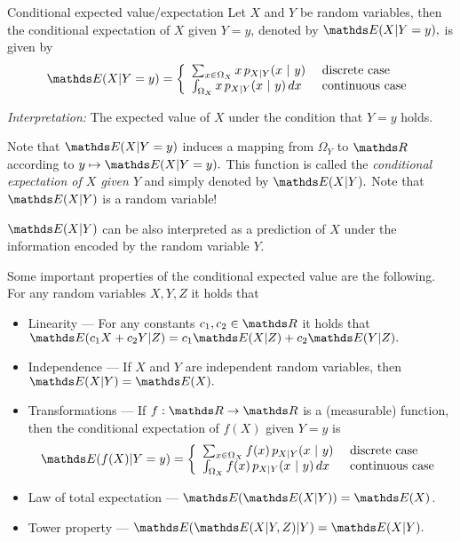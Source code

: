 \begin{vbframe}{Conditional expected value/expectation} 
%	
	Let $X$ and $Y$ be random variables, then the conditional expectation of $X$ given $Y=y$, denoted by $\E(X|Y=y),$ is given by
	$$	\E(X|Y=y) = \left\{ \begin{array}{ll}
		\sum_{x \in \Omega_X} x \, p_{X|Y}(x ~|~ y) & \text{ discrete case} \\
		\int_{\Omega_X} x \, p_{X|Y}(x ~|~ y) \, dx& \text{ continuous case} 
	\end{array} \right.  	$$
	
	\emph{Interpretation:} The expected value of $X$ under the condition that $Y=y$ holds.
	\lz
	
	Note that $\E(X|Y=y)$ induces a mapping from $\Omega_Y$ to $\R$ according to $y \mapsto \E(X|Y=y).$
	This function is called the \emph{conditional expectation of $X$ given $Y$} and simply denoted by $\E(X|Y).$
	Note that $\E(X|Y)$ is a random variable!
	
	\lz
	
	$\E(X|Y)$ can be also interpreted as a prediction of $X$ under the information encoded by the random variable $Y.$
	
	\framebreak
	
	
	Some important properties of the conditional expected value are the following. For any random variables $X,Y,Z$ it holds that
	\begin{itemize}
		\item Linearity ---  For any constants $c_1,c_2 \in \R$  it holds that $ \E(c_1 X + c_2 Y | Z) = c_1 \E(X|Z) + c_2 \E(Y|Z).$
		\item Independence --- If $X$ and $Y$ are independent random variables, then $\E(X|Y)=\E(X).$
		\item Transformations --- If $f:\R \to \R$  is a (measurable) function, then the conditional expectation of $f(X)$ given $Y=y$ is 
		$$\E(f(X)|Y=y)  = \left\{ \begin{array}{ll}
			\sum_{x \in \Omega_X} f(x) \, p_{X|Y}(x ~|~ y) & \text{ discrete case} \\
			\int_{\Omega_X} f(x) \, p_{X|Y}(x ~|~ y) \, dx & \text{ continuous case} 
		\end{array} \right.  	$$
		\item Law of total expectation ---
		$\E(\E(X|Y)) = \E(X)$.  
		\item Tower property --- $ \E(\E(X|Y,Z)|Y) = \E(X|Y).$
	\end{itemize}
	
\end{vbframe}


